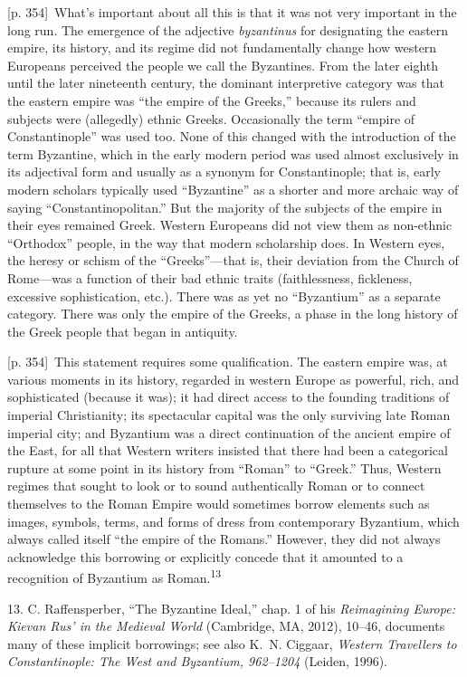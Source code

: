 \documentclass[10pt,a4paper]{article}
\begin{document}
{\scriptsize\color{gray}[p. 354]}\ What’s important about all this is that it was not very important in the long run. The emergence of the adjective \textit{byzantinus} for designating the eastern empire, its history, and its regime did not fundamentally change how western Europeans perceived the people we call the Byzantines. From the later eighth until the later nineteenth century, the dominant interpretive category was that the eastern empire was “the empire of the Greeks,” because its rulers and subjects were (allegedly) ethnic Greeks. Occasionally the term “empire of Constantinople” was used too. None of this changed with the introduction of the term Byzantine, which in the early modern period was used almost exclusively in its adjectival form and usually as a synonym for Constantinople; that is, early modern scholars typically used “Byzantine” as a shorter and more archaic way of saying “Constantinopolitan.” But the majority of the subjects of the empire in their eyes remained Greek. Western Europeans did not view them as non-ethnic “Orthodox” people, in the way that modern scholarship does. In Western eyes, the heresy or schism of the “Greeks”—that is, their deviation from the Church of Rome—was a function of their bad ethnic traits (faithlessness, fickleness, excessive sophistication, etc.). There was as yet no “Byzantium” as a separate category. There was only the empire of the Greeks, a phase in the long history of the Greek people that began in antiquity.\par
{\scriptsize\color{gray}[p. 354]}\ This statement requires some qualification. The eastern empire was, at various moments in its history, regarded in western Europe as powerful, rich, and sophisticated (because it was); it had direct access to the founding traditions of imperial Christianity; its spectacular capital was the only surviving late Roman imperial city; and Byzantium was a direct continuation of the ancient empire of the East, for all that Western writers insisted that there had been a categorical rupture at some point in its history from “Roman” to “Greek.” Thus, Western regimes that sought to look or to sound authentically Roman or to connect themselves to the Roman Empire would sometimes borrow elements such as images, symbols, terms, and forms of dress from contemporary Byzantium, which always called itself “the empire of the Romans.” However, they did not always acknowledge this borrowing or explicitly concede that it amounted to a recognition of Byzantium as Roman.\nobreak\textsuperscript{13}\par{\small 13.  C. Raffensperber, “The Byzantine Ideal,” chap. 1 of his \textit{Reimagining Europe: Kievan Rus’ in the Medieval World} (Cambridge, MA, 2012), 10–46, documents many of these implicit borrowings; see also K. N. Ciggaar, \textit{Western Travellers to Constantinople: The West and Byzantium, 962–1204} (Leiden, 1996).\par}
\end{document}
